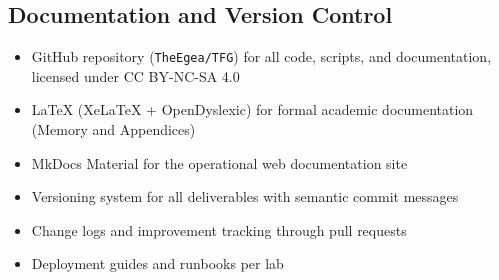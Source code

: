 \subsection{Documentation and Version Control}

\begin{itemize}
\tightlist
\item
  GitHub repository (\texttt{TheEgea/TFG}) for all code, scripts, and documentation, licensed under CC BY-NC-SA 4.0
\item
  LaTeX (XeLaTeX + OpenDyslexic) for formal academic documentation (Memory and Appendices)
\item
  MkDocs Material for the operational web documentation site
\item
  Versioning system for all deliverables with semantic commit messages
\item
  Change logs and improvement tracking through pull requests
\item
  Deployment guides and runbooks per lab
\end{itemize}
